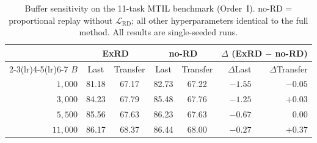 \documentclass{article}
\begin{document}
   \begin{table}[h]
  \centering                                                                \caption{Buffer sensitivity on the 11-task MTIL benchmark (Order~I).
  no-RD = proportional replay without $\mathcal{L}_{\text{RD}}$; all other
  hyperparameters identical to the full method. All results are single-seeded runs.}
  \label{tab:buffer}                                                       \setlength{\tabcolsep}{5pt}                                              \begin{tabular}{r cc cc rr}                                              
  \toprule
  & \multicolumn{2}{c}{\textbf{ExRD}} & \multicolumn{2}{c}{\textbf{no-RD}} &    \multicolumn{2}{c}{\textbf{$\Delta$ (ExRD $-$ no-RD)}} \\           
  \cmidrule(lr){2-3}\cmidrule(lr){4-5}\cmidrule(lr){6-7}
  $B$ & Last & Transfer & Last & Transfer & $\Delta$Last & $\Delta$Transfer \\                                                                                                      
  \midrule                                                                                                                                                                                    
  $1{,}000$  & 81.18 & 67.17 & 82.73 & 67.22 & $-1.55$ & $-0.05$ \\                                            
  $3{,}000$  & 84.23 & 67.79 & 85.48 & 67.76 & $-1.25$ & $+0.03$ \\  
  $5{,}500$  & 85.56 & 67.63 & 86.23 & 67.63 & $-0.67$ & $\phantom{+}0.00$ \\                                                                        $11{,}000$ & 86.17 & 68.37 & 86.44 & 68.00 & $-0.27$ & $+0.37$ \\        \bottomrule                                              
  \end{tabular}                                           
  \end{table}  

  
\end{document}
